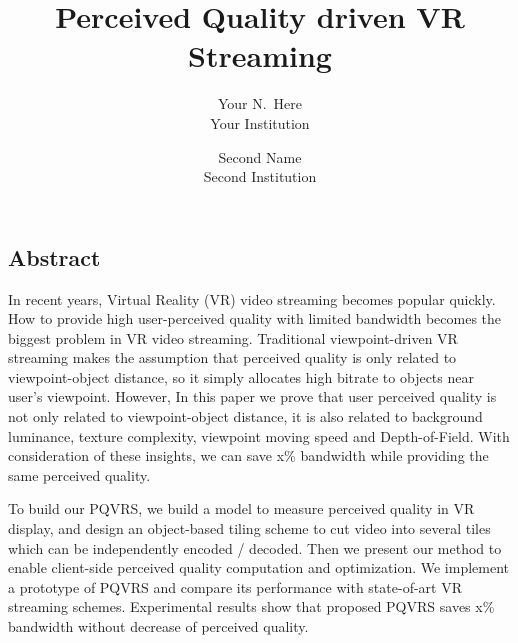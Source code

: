 \documentclass[letterpaper,twocolumn,10pt]{article}
\begin{document}
\date{}

\title{\Large \bf Perceived Quality driven VR Streaming}

\author{
{\rm Your N.\ Here}\\
Your Institution
\and
{\rm Second Name}\\
Second Institution
} %

\maketitle

\thispagestyle{empty}


\subsection*{Abstract}
In recent years, Virtual Reality (VR) video streaming becomes popular quickly. How to provide high user-perceived quality with limited bandwidth becomes the biggest problem in VR video streaming. Traditional viewpoint-driven VR streaming makes the assumption that perceived quality is only related to viewpoint-object distance, so it simply allocates high bitrate to objects near user's viewpoint. However, In this paper we prove that user perceived quality is not only related to viewpoint-object distance, it is also related to background luminance, texture complexity, viewpoint moving speed and Depth-of-Field. With consideration of these insights, we can save x\% bandwidth while providing the same perceived quality.

To build our PQVRS, we build a model to measure perceived quality in VR display, and design an object-based tiling scheme to cut video into several tiles which can be independently encoded / decoded. Then we present our method to enable client-side perceived quality computation and optimization. We implement a prototype of PQVRS and compare its performance with state-of-art VR streaming schemes. Experimental results show that proposed PQVRS saves x\% bandwidth without decrease of perceived quality.














{\footnotesize 
}
\end{document}
